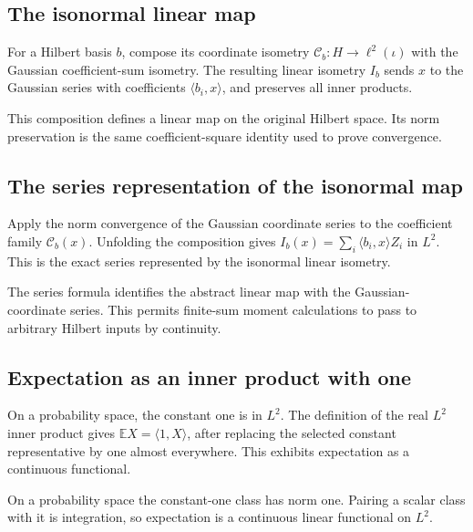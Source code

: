 \documentclass[11pt,a4paper]{article}
\begin{document}
\subsection{\texorpdfstring{The isonormal linear map}{The isonormal linear map}}


For a Hilbert basis \(b\), compose its coordinate isometry \(\mathcal C_b:H\to\ell^2(\iota)\) with the Gaussian coefficient-sum isometry. The resulting linear isometry \(I_b\) sends \(x\) to the Gaussian series with coefficients \(\langle b_i,x\rangle\), and preserves all inner products.



This composition defines a linear map on the original Hilbert space. Its norm preservation is the same coefficient-square identity used to prove convergence.


\subsection{\texorpdfstring{The series representation of the isonormal map}{The series representation of the isonormal map}}


Apply the norm convergence of the Gaussian coordinate series to the coefficient family \(\mathcal C_b(x)\). Unfolding the composition gives \(I_b(x)=\sum_i\langle b_i,x\rangle Z_i\) in \(L^2\). This is the exact series represented by the isonormal linear isometry.



The series formula identifies the abstract linear map with the Gaussian-coordinate series. This permits finite-sum moment calculations to pass to arbitrary Hilbert inputs by continuity.


\subsection{\texorpdfstring{Expectation as an inner product with one}{Expectation as an inner product with one}}


On a probability space, the constant one is in \(L^2\). The definition of the real \(L^2\) inner product gives \(\mathbb EX=\langle1,X\rangle\), after replacing the selected constant representative by one almost everywhere. This exhibits expectation as a continuous functional.



On a probability space the constant-one class has norm one. Pairing a scalar class with it is integration, so expectation is a continuous linear functional on \(L^2\).
\end{document}

